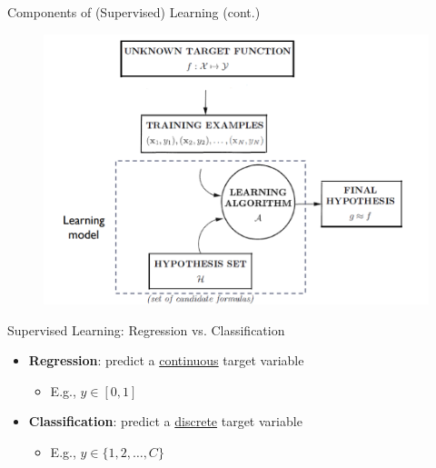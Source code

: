 \documentclass[serif, aspectratio=169]{beamer}
\begin{document}
\begin{frame}{Components of (Supervised) Learning (cont.)}
\begin{figure}[h]
  \centering
  \includegraphics[width=0.7\linewidth]{pic/4.png}
\end{figure}
\end{frame}


\begin{frame}{Supervised Learning: Regression vs. Classification}

    \begin{itemize}
        \item \textbf{Regression}: predict a \underline{continuous} target variable
        \begin{itemize}
            \item E.g., $y \in [0, 1]$
        \end{itemize}
        \item \textbf{Classification}: predict a \underline{discrete} target variable
        \begin{itemize}
            \item E.g., $y \in \{1, 2, \ldots, C\}$
        \end{itemize}
    \end{itemize}

\end{frame}
\end{document}
